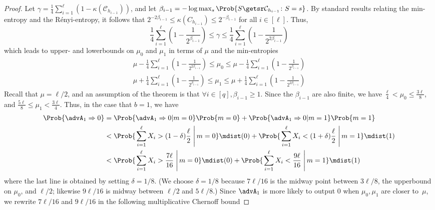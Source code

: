 \begin{proof}
Let $\gamma = \frac{1}{4}\sum_{i=1}^{\ell}(1-\kappa(\mathcal{C}_{h_{i-1}}))$, and let
$ \beta_{i-1} = -\log \max_{s}\Prob{S\getsr\mathcal{C}_{h_{i-1}}\colon
  S=s}$.
By standard results relating the min-entropy and the
R{\'e}nyi-entropy, it follows that $2^{-2\beta_{i-1}} \leq
\kappa(C_{h_{i-1}}) \leq 2^{-\beta_{i-1}}$ for all $i\in[\ell]$.
Thus,
\[
\frac{1}{4}\sum_{i=1}^{\ell}\left(1-\frac{1}{2^{\beta_{i-1}}} \right)
\leq \gamma \leq \frac{1}{4}\sum_{i=1}^{\ell} \left(1-\frac{1}{2^{2\beta_{i-1}}} \right)
\]
which leads to upper- and lowerbounds on $\mu_0$ and $\mu_1$ in terms of $\mu$ and the min-entropies
\begin{align*}
\mu - \frac{1}{4}\sum_{i=1}^{\ell} \left(1-\frac{1}{2^{2\beta_{i-1}}} \right) \leq
\mu_0 \leq 
\mu - \frac{1}{4}\sum_{i=1}^{\ell} \left(1-\frac{1}{2^{\beta_{i-1}}} \right) \\
\mu + \frac{1}{4}\sum_{i=1}^{\ell}\left(1-\frac{1}{2^{\beta_{i-1}}} \right)  
\leq \mu_1 \leq 
\mu + \frac{1}{4}\sum_{i=1}^{\ell}\left(1-\frac{1}{2^{2\beta_{i-1}}} \right) 
\end{align*}
Recall that $\mu=\ell/2$, and an assumption of the theorem is that 
$\forall i\in [q], \beta_{i-1} \geq 1$.  Since the $\beta_{i-1}$ are also finite, we have
$\frac{\ell}{4} < \mu_0 \leq \frac{3\ell}{8}$, and 
$\frac{5\ell}{8} \leq \mu_1 < \frac{3\ell}{4}$.
\noindent
Thus, in the case that $b=1$, we have
\begin{align*}
\Prob{\advA_1 \Rightarrow 0} =&\; \Prob{\advA_1 \Rightarrow 0 | m=0}\Prob{m=0} + \Prob{\advA_1 \Rightarrow 0 | m=1}\Prob{m=1}\\
< &\;
\Prob{\left. \sum_{i=1}^{\ell} X_i > (1-\delta)\frac{\ell}{2} \;\right| m=0}\mdist(0) 
+ \Prob{\left. \sum_{i=1}^{\ell} X_i < (1+\delta)\frac{\ell}{2} \; \right| m=1}\mdist(1)\\
< &\;
\Prob{\left. \sum_{i=1}^{\ell} X_i > \frac{7\ell}{16} \;\right| m=0}\mdist(0) 
+ \Prob{\left. \sum_{i=1}^{\ell} X_i < \frac{9\ell}{16} \;\right| m=1 }\mdist(1)
\end{align*}
where the last line is obtained by setting $\delta=1/8$. (We choose $\delta=1/8$ because $7\ell/16$ is the midway point between $3\ell/8$, the upperbound on $\mu_0$, and $\ell/2$; likewise $9\ell/16$ is midway between $\ell/2$ and $5\ell/8$.)  Since $\advA_1$ is more likely to output 0 when $\mu_0,\mu_1$ are closer to~$\mu$, we rewrite $7\ell/16$ and $9\ell/16$ in the following multiplicative Chernoff bound

\end{proof}
